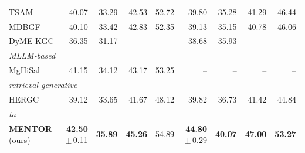 \begin{table}[t]
\begin{tabular}{l r r r r r r r r}
TSAM & 40.07 & 33.29 & 42.53 & 52.72 & 39.80 & 35.28 & 41.29 & 46.44 \\
MDBGF & 40.10 & 33.42 & 42.83 & 52.35 & 39.13 & 35.15 & 40.78 & 46.06 \\
DyME-KGC & 36.35 & 31.17 & -- & -- & 38.68 & 35.93 & -- & -- \\
\multicolumn{9}{l}{\itshape MLLM-based} \\
MgHiSal & 41.15 & 34.12 & 43.17 & 53.25 & -- & -- & -- & -- \\
\multicolumn{9}{l}{\itshape retrieval-generative} \\
HERGC & 39.12 & 33.65 & 41.67 & 48.12 & 39.82 & 36.73 & 41.42 & 44.84 \\
\multicolumn{9}{l}{\itshape ta} \\
\midrule
\textbf{MENTOR} (ours) & \textbf{42.50} \,$\pm$\,0.11 & \textbf{35.89} & \textbf{45.26} & 54.89 & \textbf{44.80} \,$\pm$\,0.29 & \textbf{40.07} & \textbf{47.00} & \textbf{53.27} \\
\bottomrule
\end{tabular}
\end{table}
